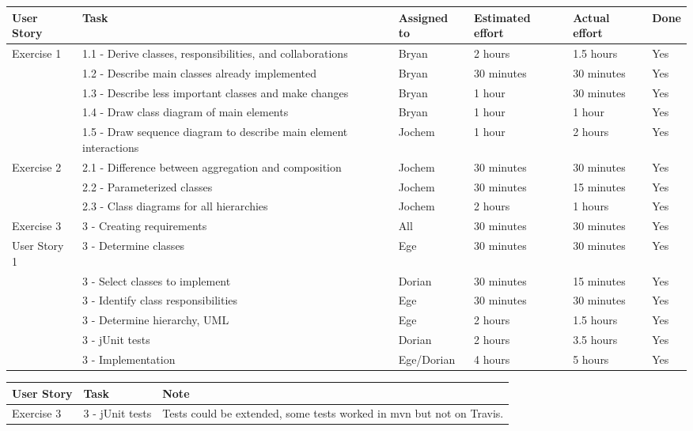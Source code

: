 \documentclass[10pt]{article}
\begin{document}
\begin{center}

    \hspace*{-3cm}\begin{tabular}{ | p{2cm} | p{9cm} | p{2cm} | p{1.8cm} | p{1.8cm} | p{1cm} |}
    \hline
    User Story & Task & Assigned to & Estimated effort & Actual effort & Done \\ \hline
    Exercise 1 & 1.1 - Derive classes, responsibilities, and collaborations & Bryan & 2 hours & 1.5 hours & Yes \\ \hline
    & 1.2 - Describe main classes already implemented & Bryan & 30 minutes & 30 minutes & Yes \\
    & 1.3 - Describe less important classes and make changes & Bryan & 1 hour & 30 minutes & Yes \\
    & 1.4 - Draw class diagram of main elements & Bryan & 1 hour & 1 hour & Yes\\
    & 1.5 - Draw sequence diagram to describe main element interactions & Jochem & 1 hour & 2 hours & Yes\\ \hline
    Exercise 2 & 2.1 - Difference between aggregation and composition & Jochem & 30 minutes & 30 minutes & Yes\\ 
    & 2.2 - Parameterized classes & Jochem & 30 minutes & 15 minutes & Yes\\
    & 2.3 - Class diagrams for all hierarchies & Jochem & 2 hours & 1 hours & Yes\\ \hline
    Exercise 3 & 3 - Creating requirements & All & 30 minutes & 30 minutes & Yes\\ 
    User Story 1& 3 - Determine classes & Ege & 30 minutes & 30 minutes & Yes\\ 
    & 3 - Select classes to implement & Dorian & 30 minutes & 15 minutes & Yes\\
    & 3 - Identify class responsibilities & Ege & 30 minutes & 30 minutes & Yes\\
    & 3 - Determine hierarchy, UML & Ege & 2 hours & 1.5 hours & Yes\\
    & 3 - jUnit tests & Dorian & 2 hours & 3.5 hours & Yes\\
    & 3 - Implementation & Ege/Dorian & 4 hours & 5 hours & Yes\\ \hline    
    \end{tabular}
        \vspace{10mm}

        \hspace*{-3cm}\begin{tabular}{| p{2cm} | p{9cm} | p{7.8cm} |}
        \hline
        User Story & Task & Note \\ \hline
        Exercise 3 & 3 - jUnit tests & Tests could be extended, some tests worked in mvn but not on Travis. \\ \hline
        \end{tabular}
\end{center}
\end{document}
